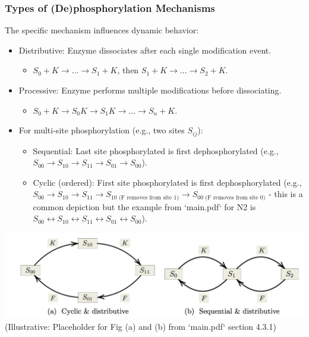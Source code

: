 \documentclass[aspectratio=169]{beamer}
\begin{document}
\begin{frame}{\insertsectionhead}
	\frametitle{Types of (De)phosphorylation Mechanisms}
	The specific mechanism influences dynamic behavior:
	\begin{itemize}
		\item \alert{Distributive}: Enzyme dissociates after each single modification event.
			\begin{itemize}
				\item $S_0 + K \to \dots \to S_1 + K$, then $S_1 + K \to \dots \to S_2 + K$.
			\end{itemize}
		\item \alert{Processive}: Enzyme performs multiple modifications before dissociating.
			\begin{itemize}
				\item $S_0 + K \to S_0K \to S_1K \to \dots \to S_n + K$.
			\end{itemize}
		\item For multi-site phosphorylation (e.g., two sites $S_{ij}$):
			\begin{itemize}
				\item \alert{Sequential}: Last site phosphorylated is first dephosphorylated (e.g., $S_{00} \to S_{10} \to S_{11} \to S_{01} \to S_{00}$).
				\item \alert{Cyclic (ordered)}: First site phosphorylated is first dephosphorylated (e.g., $S_{00} \to S_{10} \to S_{11} \to S_{10 \text{ (F removes from site 1)}} \to S_{00 \text{ (F removes from site 0)}}$ - this is a common depiction but the example from `main.pdf` for N2 is $S_{00} \leftrightarrow S_{10} \leftrightarrow S_{11} \leftrightarrow S_{01} \leftrightarrow S_{00}$).
			\end{itemize}
	\end{itemize}
	\centering
	\includegraphics[width=0.6\linewidth]{pics/cyclic-vs-sequential.png} \\
	\tiny (Illustrative: Placeholder for Fig (a) and (b) from `main.pdf` section 4.3.1)
\end{frame}
\end{document}
